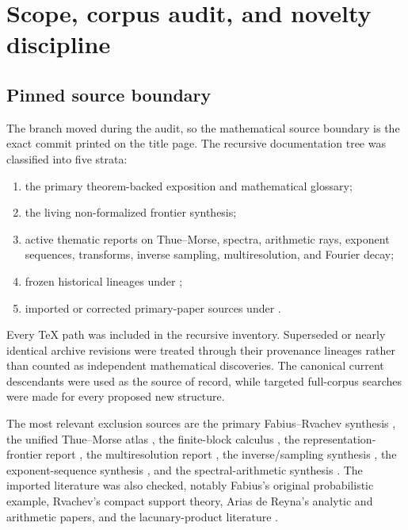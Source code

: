 \documentclass[11pt,oneside]{article}
\numberwithin{equation}{section}
\theoremstyle{definition}
\theoremstyle{remark}
\newcommand{\Up}{\operatorname{up}}
\begin{document}
\begin{abstract}
Finally, convolution is recast as an infinite product of averaging operators,
\[
 \Up=\exp\!\left(
  \sum_{m\ge1}\frac{B_{2m}}{2m(2m)!(1-4^{-m})}D^{2m}
 \right)\delta_0,
\]
with a rigorous polynomial interpretation and a strong-operator
interpretation through uniform averaging.  Commented Python code checks the
polyphase products, Fourier deconvolution, exact power sums, and cumulant
recombination.  Throughout, ``new'' means new relative to the pinned repository
snapshot; no claim of worldwide bibliographic priority is made without a
separate exhaustive literature search.
\end{abstract}

\tableofcontents
\clearpage

\section{Scope, corpus audit, and novelty discipline}
\label{sec:audit}

\subsection{Pinned source boundary}

The branch moved during the audit, so the mathematical source boundary is the
exact commit printed on the title page.  The recursive documentation tree was
classified into five strata:
\begin{enumerate}
\item the primary theorem-backed exposition and mathematical glossary;
\item the living non-formalized frontier synthesis;
\item active thematic reports on Thue--Morse, spectra, arithmetic rays,
      exponent sequences, transforms, inverse sampling, multiresolution, and
      Fourier decay;
\item frozen historical lineages under ;
\item imported or corrected primary-paper sources under .
\end{enumerate}
Every TeX path was included in the recursive inventory.  Superseded or nearly
identical archive revisions were treated through their provenance lineages
rather than counted as independent mathematical discoveries.  The canonical
current descendants were used as the source of record, while targeted
full-corpus searches were made for every proposed new structure.

The most relevant exclusion sources are the primary Fabius--Rvachev synthesis
\cite{repoPrimary}, the unified Thue--Morse atlas \cite{repoAtlas}, the
finite-block calculus \cite{repoFiniteBlock}, the representation-frontier
report \cite{repoRepresentations}, the multiresolution report
\cite{repoMultiresolution}, the inverse/sampling synthesis \cite{repoInverse},
the exponent-sequence synthesis \cite{repoExponents}, and the
spectral-arithmetic synthesis \cite{repoSpectra}.  The imported literature was
also checked, notably Fabius's original probabilistic example, Rvachev's compact
support theory, Arias de Reyna's analytic and arithmetic papers, and the
lacunary-product literature \cite{fabius1966,rvachev1990,arias1982,arias2018,
aistleitner2017}.
\end{document}
